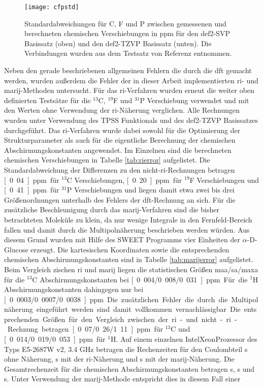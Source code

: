 \begin{figure}[ht!]
	\centering
	\texttt{[image: cfpstd]}
	\captionsetup{figurewithin = chapter}
	\captionsetup{font=small, labelfont=bf}\caption[Standardabweichungen für unterschiedliche Funktionale und Basissätze]{Standardabweichungen für C, F und P zwischen gemessenen und berechneten chemischen Verschiebungen in ppm für den def2-SVP Basissatz (oben) und den def2-TZVP Basissatz (unten). Die Verbindungen wurden aus dem Testsatz von Referenz \cite{gauss1993effects} entnommen.} 
\label{abb:cfpshifts}
\end{figure}

\FloatBarrier
Neben den gerade beschriebenen allgemeinen Fehlern die durch die \ac{dft} gemacht werden, wurden außerdem die Fehler der in dieser Arbeit implementierten \ac{ri}- und \ac{marij}-Methoden untersucht. Für das \ac{ri}-Verfahren wurden erneut die weiter oben definierten Testsätze für die $^{13}$C, $^{19}$F und $^{31}$P Verschiebung verwendet und mit den Werten ohne Verwendung der \ac{ri}-Näherung verglichen. Alle Rechnungen wurden unter Verwendung des TPSS Funktionals und des def2-TZVP Basissatzes durchgeführt. Das \ac{ri}-Verfahren wurde dabei sowohl für die Optimierung der Strukturparameter als auch für die eigentliche Berechnung der chemischen Abschirmungskonstanten angewendet. Im Einzelnen sind die berechneten chemischen Verschiebungen in Tabelle \ref{tab:rierror} aufgelistet. Die Standardabweichung der Differenzen zu den nicht-\ac{ri}-Rechnungen betragen \unit[0.04]{ppm} für $^{13}$C Verschiebungen, \unit[0.20]{ppm} für $^{19}$F Verschiebungen und \unit[0.41]{ppm} für $^{31}$P Verschiebungen und liegen damit etwa zwei bis drei Größenordnungen unterhalb des Fehlers der \ac{dft}-Rechnung an sich. Für die zusätzliche Beschleunigung durch das \ac{marij}-Verfahren sind die bisher betrachteten Moleküle zu klein, da nur wenige Integrale in den Fernfeld-Bereich fallen und damit durch die Multipolnäherung beschrieben werden würden. Aus diesem Grund wurden mit Hilfe des SWEET\supercite{bohne1999sweet} Programms vier Einheiten der $\alpha$-D-Glucose erzeugt. Die kartesischen Koordinaten sowie die entsprechenden chemischen Abschirmungskonstanten sind in Tabelle \ref{tab:marijerror} aufgelistet. Beim Vergleich zischen \ac{ri} und \ac{marij} liegen die statistischen Größen \ac{maa}/\ac{sa}/\ac{maxa} für die $^{13}$C Abschirmungskonstanten bei \unit[0.004/0.008/0.031]{ppm}. Für die $^{1}$H Abschirmungskonstanten dahingegen nur bei \unit[0.0003/0.0007/0.0038]{ppm}. Die zusätzlichen Fehler die durch die Multipolnäherung eingeführt werden sind damit vollkommen vernachlässigbar. Die entsprechenden Größen für den Vergleich zwischen der \ac{ri}- und nicht-\ac{ri}-Rechnung betragen \unit[0.07/0.26/1.11]{ppm} für $^{13}$C und \unit[0.014/0.019/0.053]{ppm} für $^{1}$H. Auf einem einzelnen Intel\textregistered Xeon\textregistered Prozessor des Typs E5-2687W v2, 3.4 GHz betragen die Rechenzeiten für den Coulombteil \unit[4099]{s} ohne Näherung, \unit[220]{s} mit der \ac{ri}-Näherung und \unit[117]{s} mit der \ac{marij}-Näherung. Die Gesamtrechenzeit für die chemischen Abschirmungskonstanten betragen \unit[4610]{s}, \unit[741]{s} und \unit[633]{s}. Unter Verwendung der \ac{marij}-Methode entspricht dies in diesem Fall einer 
